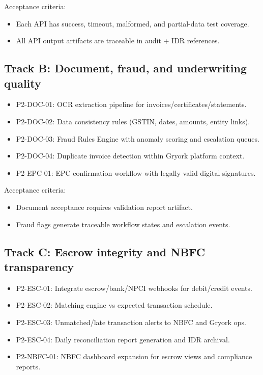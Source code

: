 ﻿\documentclass[12pt]{article}
\begin{document}
Acceptance criteria:

\begin{itemize}
\item Each API has success, timeout, malformed, and partial-data test coverage.
\item All API output artifacts are traceable in audit + IDR references.
\end{itemize}

\subsection{Track B: Document, fraud, and underwriting quality}


\begin{itemize}
\item P2-DOC-01: OCR extraction pipeline for invoices/certificates/statements.
\item P2-DOC-02: Data consistency rules (GSTIN, dates, amounts, entity links).
\item P2-DOC-03: Fraud Rules Engine with anomaly scoring and escalation queues.
\item P2-DOC-04: Duplicate invoice detection within Gryork platform context.
\item P2-EPC-01: EPC confirmation workflow with legally valid digital signatures.
\end{itemize}

Acceptance criteria:

\begin{itemize}
\item Document acceptance requires validation report artifact.
\item Fraud flags generate traceable workflow states and escalation events.
\end{itemize}

\subsection{Track C: Escrow integrity and NBFC transparency}


\begin{itemize}
\item P2-ESC-01: Integrate escrow/bank/NPCI webhooks for debit/credit events.
\item P2-ESC-02: Matching engine vs expected transaction schedule.
\item P2-ESC-03: Unmatched/late transaction alerts to NBFC and Gryork ops.
\item P2-ESC-04: Daily reconciliation report generation and IDR archival.
\item P2-NBFC-01: NBFC dashboard expansion for escrow views and compliance reports.
\end{itemize}
\end{document}
